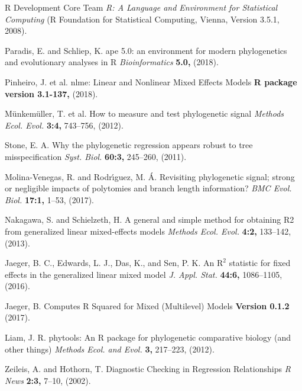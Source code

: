 \documentclass[twocolumn, linenumbers, superscriptaddress, nofootinbib]{revtex4-1}
\begin{document}
\begin{thebibliography}{50}
				R Development Core Team
				\textit{R: A Language and Environment for Statistical Computing}
				(R Foundation for Statistical Computing,
				Vienna,
				Version 3.5.1,
				2008).
			
				Paradis, E. and Schliep, K.
				ape 5.0: an environment for modern phylogenetics and evolutionary analyses in R
				\textit{Bioinformatics}
				\textbf{5.0,}
				(2018).
			
				Pinheiro, J. et al.
				nlme: Linear and Nonlinear Mixed Effects Models
				\textbf{R package version 3.1-137,}
				(2018).
			
				M{\"u}nkem{\"u}ller, T. et al.
				How to measure and test phylogenetic signal
				\textit{Methods Ecol. Evol.}
				\textbf{3:4,}
				743--756,
				(2012).
			
				Stone, E. A.
				Why the phylogenetic regression appears robust to tree misspecification
				\textit{Syst. Biol.}
				\textbf{60:3,}
				245--260,
				(2011).
			
				Molina-Venegas, R. and Rodr{\'\i}guez, M. {\'A}.
				Revisiting phylogenetic signal; strong or negligible impacts of polytomies and branch length information?
				\textit{BMC Evol. Biol.}
				\textbf{17:1,}
				1--53,
				(2017).			
			
				Nakagawa, S. and Schielzeth, H.
				A general and simple method for obtaining R2 from generalized linear mixed-effects models
				\textit{Methods Ecol. Evol.}
				\textbf{4:2,}
				133--142,
				(2013).
		
				Jaeger, B. C., Edwards, L. J., Das, K., and Sen, P. K.
				An $\text{R}^2$ statistic for fixed effects in the generalized linear mixed model
				\textit{J. Appl. Stat.}
				\textbf{44:6,}
				1086--1105,
				(2016).
			
				Jaeger, B.
				Computes R Squared for Mixed (Multilevel) Models
				\textbf{Version 0.1.2}
				(2017).
			
				Liam, J. R.
				phytools: An R package for phylogenetic comparative biology (and other things)
				\textit{Methods Ecol. and Evol.}
				\textbf{3,}
				217--223,
				(2012).
		
				Zeileis, A. and Hothorn, T.
				Diagnostic Checking in Regression Relationships
				\textit{R News}
				\textbf{2:3,}
				7--10,
				(2002).
	\end{thebibliography}
\end{document}
